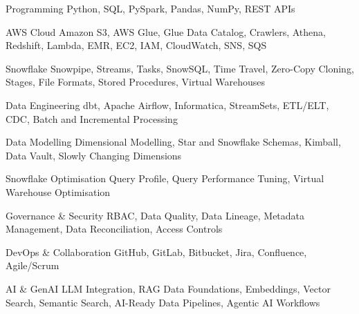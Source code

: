 
\begin{minipage}[t]{\dimexpr(\linewidth/2) - 0.5em}
  \vspace{-0.8em}
  \begin{cvskills}
    \cvskill
      {Programming}
      {Python, SQL, PySpark, Pandas, NumPy, REST APIs}

    \cvskill
      {AWS Cloud}
      {Amazon S3, AWS Glue, Glue Data Catalog, Crawlers, Athena, Redshift, Lambda, EMR, EC2, IAM, CloudWatch, SNS, SQS}

    \cvskill
      {Snowflake}
      {Snowpipe, Streams, Tasks, SnowSQL, Time Travel, Zero-Copy Cloning, Stages, File Formats, Stored Procedures, Virtual Warehouses}

    \cvskill
      {Data Engineering}
      {dbt, Apache Airflow, Informatica, StreamSets, ETL/ELT, CDC, Batch and Incremental Processing}

    \cvskill
      {Data Modelling}
      {Dimensional Modelling, Star and Snowflake Schemas, Kimball, Data Vault, Slowly Changing Dimensions}
  \end{cvskills}
\end{minipage}
\hfill
\begin{minipage}[t]{\dimexpr(\linewidth/2) - 0.5em}
  \vspace{-0.8em}
  \begin{cvskills}
    \cvskill
      {Snowflake Optimisation}
      {Query Profile, Query Performance Tuning, Virtual Warehouse Optimisation}

    \cvskill
      {Governance \& Security}
      {RBAC, Data Quality, Data Lineage, Metadata Management, Data Reconciliation, Access Controls}

    \cvskill
      {DevOps \& Collaboration}
      {GitHub, GitLab, Bitbucket, Jira, Confluence, Agile/Scrum}

    \cvskill
      {AI \& GenAI}
      {LLM Integration, RAG Data Foundations, Embeddings, Vector Search, Semantic Search, AI-Ready Data Pipelines, Agentic AI Workflows}
  \end{cvskills}
\end{minipage}
